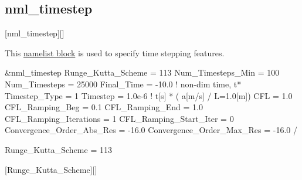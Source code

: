 \subsection{nml\_timestep}
\label{SEC:nml_timestep}
\inp*[nmlTimestep]{}[nml\_timestep][]

This \hyperref[SEC:User_Input]{namelist block}
is used to specify time stepping features.

\begin{nmlblocklst}[
,label={LST:nml_timestep}
,caption={Namelist nml\_timestep.}
]
&nml_timestep
  Runge_Kutta_Scheme        =    113
  Num_Timesteps_Min         =    100
  Num_Timesteps             =  25000
  Final_Time                =  -10.0  ! non-dim time, t*
  Timestep_Type             =      1
  Timestep                  = 1.0e-6  ! t[s] * ( a[m/s] / L=1.0[m])
  CFL                       =    1.0
  CFL_Ramping_Beg           =    0.1
  CFL_Ramping_End           =    1.0
  CFL_Ramping_Iterations    =      1
  CFL_Ramping_Start_Iter    =      0
  Convergence_Order_Abs_Res =  -16.0
  Convergence_Order_Max_Res =  -16.0
/
\end{nmlblocklst}


\begin{nmldescitem}
Runge_Kutta_Scheme = 113
\end{nmldescitem}
[Runge\_Kutta\_Scheme][]

